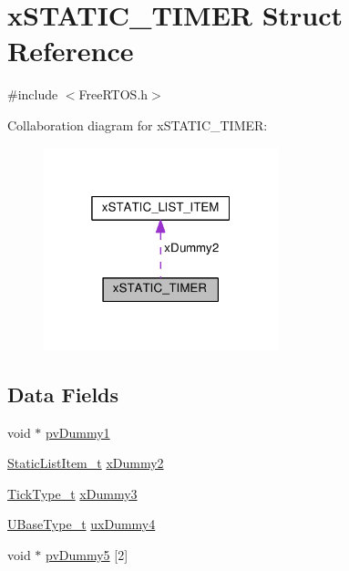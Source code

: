 \hypertarget{structxSTATIC__TIMER}{}\section{x\+S\+T\+A\+T\+I\+C\+\_\+\+T\+I\+M\+ER Struct Reference}
\label{structxSTATIC__TIMER}


{\ttfamily \#include $<$Free\+R\+T\+O\+S.\+h$>$}



Collaboration diagram for x\+S\+T\+A\+T\+I\+C\+\_\+\+T\+I\+M\+ER\+:\nopagebreak
\begin{figure}[H]
\begin{center}
\leavevmode
\includegraphics[width=193pt]{da/d8e/structxSTATIC__TIMER__coll__graph}
\end{center}
\end{figure}
\subsection*{Data Fields}
\begin{DoxyCompactItemize}
\item 
void $\ast$ \hyperlink{structxSTATIC__TIMER_a040499298faced6032f84f3a33c785fd}{pv\+Dummy1}
\item 
\hyperlink{FreeRTOS_8h_a1d31bc0472385a87424518da484d9e09}{Static\+List\+Item\+\_\+t} \hyperlink{structxSTATIC__TIMER_a622e2e596e5829c9197bb44b9009474f}{x\+Dummy2}
\item 
\hyperlink{portmacro_8h_aa69c48c6e902ce54f70886e6573c92a9}{Tick\+Type\+\_\+t} \hyperlink{structxSTATIC__TIMER_a60d582d1d0b5b9b15e8050d5ae29bc30}{x\+Dummy3}
\item 
\hyperlink{portmacro_8h_a646f89d4298e4f5afd522202b11cb2e6}{U\+Base\+Type\+\_\+t} \hyperlink{structxSTATIC__TIMER_abe61bde25ac09934004caa0222f4831b}{ux\+Dummy4}
\item 
void $\ast$ \hyperlink{structxSTATIC__TIMER_a9410b4450349079b65e2c25605913cbf}{pv\+Dummy5} \mbox{[}2\mbox{]}
\end{DoxyCompactItemize}


